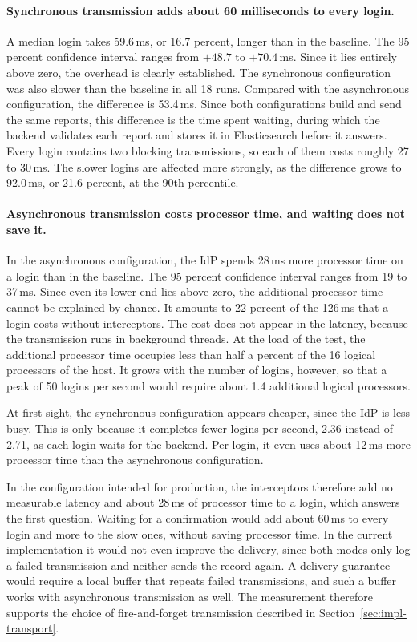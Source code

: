 \documentclass[../main.tex]{subfiles}
\begin{document}
\paragraph{Synchronous transmission adds about 60 milliseconds to every login.}
A median login takes 59.6\,ms, or 16.7 percent, longer than in the baseline. 
The 95 percent confidence interval ranges from $+48.7$ to $+70.4$\,ms. 
Since it lies entirely above zero, the overhead is clearly established. 
The synchronous configuration was also slower than the baseline in all 18 runs. 
Compared with the asynchronous configuration, the difference is 53.4\,ms. 
Since both configurations build and send the same reports, this difference is the time spent 
waiting, during which the backend validates each report and stores it in Elasticsearch before it 
answers. 
Every login contains two blocking transmissions, so each of them costs roughly 27 to 30\,ms. 
The slower logins are affected more strongly, as the difference grows to 92.0\,ms, or 21.6 percent, 
at the 90th percentile. 

\paragraph{Asynchronous transmission costs processor time, and waiting does not save it.}
In the asynchronous configuration, the IdP spends 28\,ms more processor time on a login than in the 
baseline. 
The 95 percent confidence interval ranges from 19 to 37\,ms. 
Since even its lower end lies above zero, the additional processor time cannot be explained by 
chance. 
It amounts to 22 percent of the 126\,ms that a login costs without interceptors. 
The cost does not appear in the latency, because the transmission runs in background threads. 
At the load of the test, the additional processor time occupies less than half a percent of the 16 
logical processors of the host. 
It grows with the number of logins, however, so that a peak of 50 logins per second would require 
about 1.4 additional logical processors. 

At first sight, the synchronous configuration appears cheaper, since the IdP is less busy. 
This is only because it completes fewer logins per second, 2.36 instead of 2.71, as each login waits 
for the backend. 
Per login, it even uses about 12\,ms more processor time than the asynchronous configuration. 

In the configuration intended for production, the interceptors therefore add no measurable latency 
and about 28\,ms of processor time to a login, which answers the first question. 
Waiting for a confirmation would add about 60\,ms to every login and more to the slow ones, without 
saving processor time. 
In the current implementation it would not even improve the delivery, since both modes only log a 
failed transmission and neither sends the record again. 
A delivery guarantee would require a local buffer that repeats failed transmissions, and such a 
buffer works with asynchronous transmission as well. 
The measurement therefore supports the choice of fire-and-forget transmission described in 
Section~\ref{sec:impl-transport}.
\end{document}

